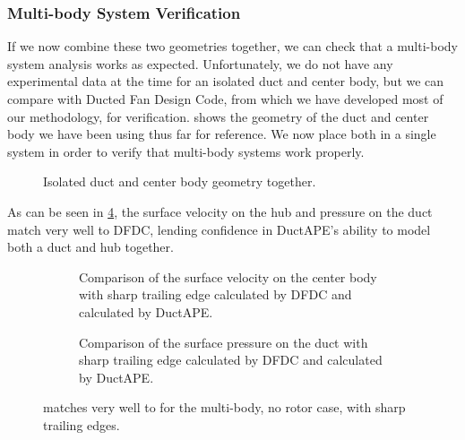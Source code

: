 \subsubsection{Multi-body System Verification}

If we now combine these two geometries together, we can check that a multi-body system analysis works as expected.
%
Unfortunately, we do not have any experimental data at the time for an isolated duct and center body, but we can compare with Ducted Fan Design Code, from which we have developed most of our methodology, for verification.
%
 shows the geometry of the duct and center body we have been using thus far for reference.
%
We now place both in a single system in order to verify that multi-body systems work properly.

\begin{figure}[h!]
    \centering
        \caption{Isolated duct and center body geometry together.}
    \label{fig:ducthubvalgeom}
\end{figure}
%
As can be seen in \cref{fig:dfdclewiscomp}, the surface velocity on the hub and pressure on the duct match very well to DFDC, lending confidence in DuctAPE's ability to model both a duct and hub together.

\begin{figure}[h!]
     \centering
     \begin{subfigure}[b]{0.45\textwidth}
         \raggedright
         \caption{Comparison of the surface velocity on the center body with sharp trailing edge calculated by DFDC and calculated by DuctAPE.}
        \label{fig:dfdclewisvel}
     \end{subfigure}
     \hfill
     \begin{subfigure}[b]{0.45\textwidth}
         \raggedright
         \caption{Comparison of the surface pressure on the duct with sharp trailing edge calculated by DFDC and calculated by DuctAPE.}
         \label{fig:dfdclewiscp}
     \end{subfigure}
     \caption{ matches very well to  for the multi-body, no rotor case, with sharp trailing edges.}
     \label{fig:dfdclewiscomp}
\end{figure}


